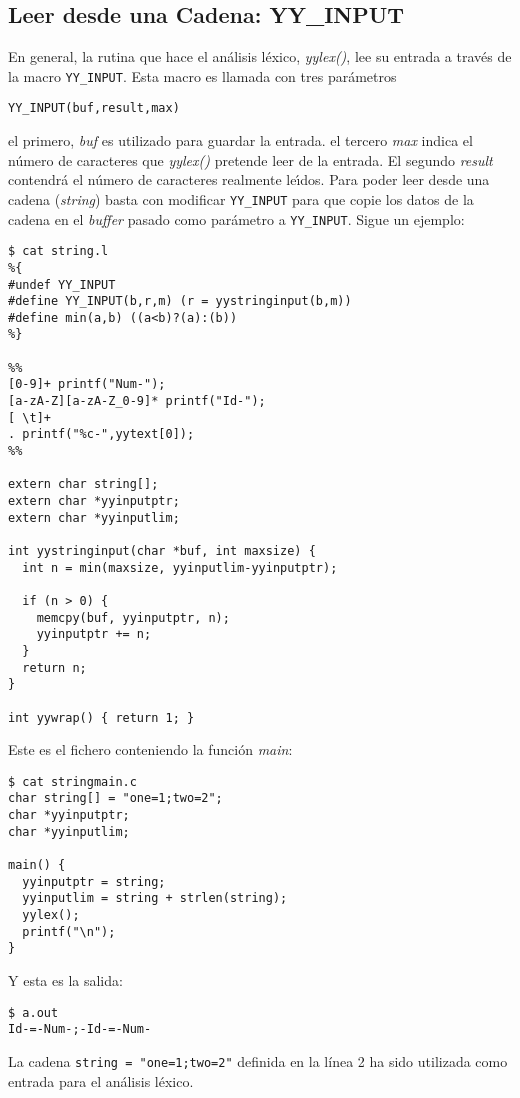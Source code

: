 \subsection{Leer desde una Cadena: YY\_INPUT}
En general, la rutina que hace el an\'alisis l\'exico,
\emph{yylex()}, lee su entrada a trav\'es de la macro
\verb|YY_INPUT|. Esta macro es llamada con tres par\'ametros
\begin{center}
\verb|YY_INPUT(buf,result,max)| 
\end{center}
el primero, \emph{buf} es utilizado para guardar la entrada.
el tercero \emph{max} indica el n\'umero de caracteres que \emph{yylex()}
pretende leer de la entrada. El segundo \emph{result} contendr\'a el n\'umero 
de caracteres realmente le\'{\i}dos. Para poder leer desde una cadena
(\emph{string}) basta
con modificar \verb|YY_INPUT| para que copie los datos de la cadena en
el \emph{buffer} pasado como par\'ametro a \verb|YY_INPUT|. 
Sigue un ejemplo: 
\begin{verbatim}
$ cat string.l
%{
#undef YY_INPUT
#define YY_INPUT(b,r,m) (r = yystringinput(b,m))
#define min(a,b) ((a<b)?(a):(b))
%}
 
%%
[0-9]+ printf("Num-");
[a-zA-Z][a-zA-Z_0-9]* printf("Id-");
[ \t]+
. printf("%c-",yytext[0]);
%%
 
extern char string[];
extern char *yyinputptr;
extern char *yyinputlim;
 
int yystringinput(char *buf, int maxsize) {
  int n = min(maxsize, yyinputlim-yyinputptr);
 
  if (n > 0) {
    memcpy(buf, yyinputptr, n);
    yyinputptr += n;
  }
  return n;
}
 
int yywrap() { return 1; }              
\end{verbatim}
Este es el fichero conteniendo la funci\'on \emph{main}:
\begin{verbatim}
$ cat stringmain.c
char string[] = "one=1;two=2";
char *yyinputptr;
char *yyinputlim;
 
main() {
  yyinputptr = string;
  yyinputlim = string + strlen(string);
  yylex();
  printf("\n");
}                              
\end{verbatim}
Y esta es la salida:
\begin{verbatim}
$ a.out
Id-=-Num-;-Id-=-Num-    
\end{verbatim}
La cadena \verb|string = "one=1;two=2"| definida en la línea 2 ha sido utilizada 
como entrada para el análisis léxico.

